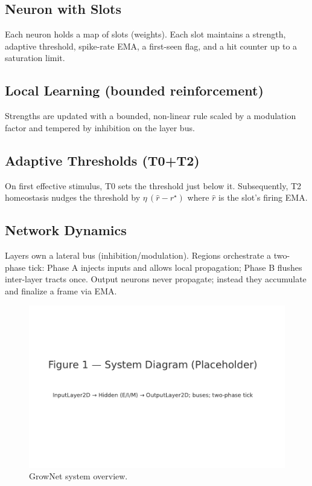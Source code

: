 \subsection{Neuron with Slots}
Each neuron holds a map of slots (weights). Each slot maintains a strength, adaptive threshold, spike-rate EMA, a first-seen flag, and a hit counter up to a saturation limit.

\subsection{Local Learning (bounded reinforcement)}
Strengths are updated with a bounded, non-linear rule scaled by a modulation factor and tempered by inhibition on the layer bus.

\subsection{Adaptive Thresholds (T0+T2)}
On first effective stimulus, T0 sets the threshold just below it. Subsequently, T2 homeostasis nudges the threshold by $\eta\,(\hat r - r^\star)$ where $\hat r$ is the slot's firing EMA.

\subsection{Network Dynamics}
Layers own a lateral bus (inhibition/modulation). Regions orchestrate a two-phase tick: Phase A injects inputs and allows local propagation; Phase B flushes inter-layer tracts once. Output neurons never propagate; instead they accumulate and finalize a frame via EMA.

\begin{figure}[t]
  \centering
  \includegraphics[width=0.95\linewidth]{figures/fig_system.pdf}
  \caption{GrowNet system overview.}
  \label{fig:system}
\end{figure}

